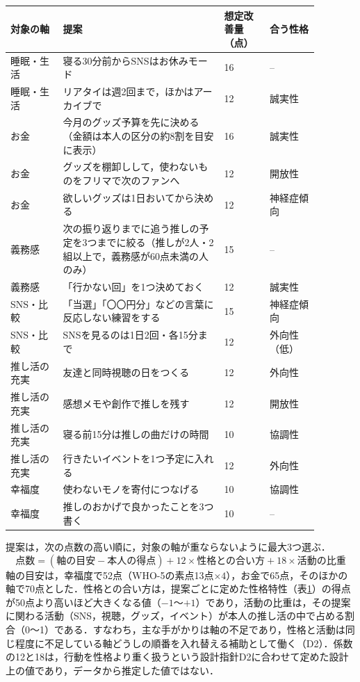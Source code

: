 \begin{table}[t]
\centering
{}
\label{tab:plans}
\small
\begin{tabular}{@{}p{0.15\linewidth}p{0.46\linewidth}p{0.13\linewidth}p{0.14\linewidth}@{}}
\toprule
対象の軸 & 提案 & 想定改善量（点） & 合う性格 \\
\midrule
睡眠・生活 & 寝る30分前からSNSはお休みモード & 16 & -- \\
睡眠・生活 & リアタイは週2回まで，ほかはアーカイブで & 12 & 誠実性 \\
お金 & 今月のグッズ予算を先に決める（金額は本人の区分の約8割を目安に表示） & 16 & 誠実性 \\
お金 & グッズを棚卸しして，使わないものをフリマで次のファンへ & 12 & 開放性 \\
お金 & 欲しいグッズは1日おいてから決める & 12 & 神経症傾向 \\
義務感 & 次の振り返りまでに追う推しの予定を3つまでに絞る（推しが2人・2組以上で，義務感が60点未満の人のみ） & 15 & -- \\
義務感 & 「行かない回」を1つ決めておく & 12 & 誠実性 \\
SNS・比較 & 「当選」「〇〇円分」などの言葉に反応しない練習をする & 15 & 神経症傾向 \\
SNS・比較 & SNSを見るのは1日2回・各15分まで & 12 & 外向性（低） \\
推し活の充実 & 友達と同時視聴の日をつくる & 12 & 外向性 \\
推し活の充実 & 感想メモや創作で推しを残す & 12 & 開放性 \\
推し活の充実 & 寝る前15分は推しの曲だけの時間 & 10 & 協調性 \\
推し活の充実 & 行きたいイベントを1つ予定に入れる & 12 & 外向性 \\
幸福度 & 使わないモノを寄付につなげる & 10 & 協調性 \\
幸福度 & 推しのおかげで良かったことを3つ書く & 10 & -- \\
\bottomrule
\end{tabular}
\end{table}

提案は，次の点数の高い順に，対象の軸が重ならないように最大3つ選ぶ．
\begin{equation}
\text{点数} = (\text{軸の目安} - \text{本人の得点}) + 12 \times \text{性格との合い方} + 18 \times \text{活動の比重}
\label{eq:planscore}
\end{equation}
軸の目安は，幸福度で52点（WHO-5の素点13点$\times4$），お金で65点，そのほかの軸で70点とした．性格との合い方は，提案ごとに定めた性格特性（表\ref{tab:plans}）の得点が50点より高いほど大きくなる値（$-1$〜$+1$）であり，活動の比重は，その提案に関わる活動（SNS，視聴，グッズ，イベント）が本人の推し活の中で占める割合（0〜1）である．すなわち，主な手がかりは軸の不足であり，性格と活動は同じ程度に不足している軸どうしの順番を入れ替える補助として働く（D2）．係数の12と18は，行動を性格より重く扱うという設計指針D2に合わせて定めた設計上の値であり，データから推定した値ではない．

